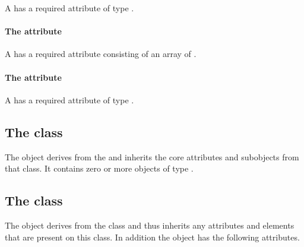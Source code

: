 A \SampledField has a required attribute  of type
.


\paragraph{The \fixttspace{} attribute}

A \SampledField has a required attribute  consisting of
an array of .


\paragraph{The \fixttspace{} attribute}

A \SampledField has a required attribute  of type
.


\subsection{The  class}
\label{listofsampledvolumes-class}


The \ListOfSampledVolumes object derives from the  and
inherits the core attributes and subobjects from that class. It contains
zero or more objects of type \SampledVolume.

\subsection{The  class}
\label{sampledvolume-class}




The \SampledVolume object derives from the \SBase class and thus
inherits any attributes and elements that are present on this class.
In addition the \SampledVolume object has the following attributes.


